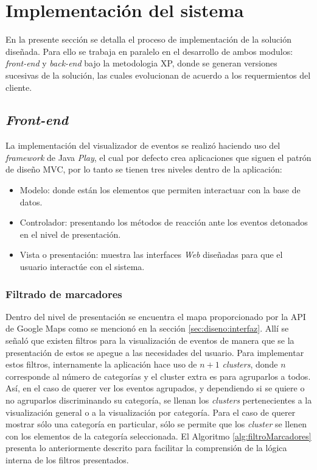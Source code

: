 \section{Implementación del sistema}
\label{sec:implementacion}

En la presente sección se detalla el proceso de implementación de la solución diseñada. Para ello se trabaja en paralelo en el desarrollo de ambos modulos: \textit{front-end} y \textit{back-end} bajo la metodologia XP, donde se generan versiones sucesivas de la solución, las cuales evolucionan de acuerdo a los requermientos del cliente.

\subsection{\textit{Front-end}}
\label{subsec:imp:visualizador}

La implementación del visualizador de eventos se realizó haciendo uso del \textit{framework} de Java \textit{Play}, el cual por defecto crea aplicaciones que siguen el patrón de diseño MVC, por lo tanto se tienen tres niveles dentro de la aplicación:

\begin{itemize}
\item Modelo: donde están los elementos que permiten interactuar con la base de datos. 
\item Controlador: presentando los métodos de reacción ante los eventos detonados en el nivel de presentación.
\item Vista o presentación: muestra las interfaces \textit{Web} diseñadas para que el usuario interactúe con el sistema.
\end{itemize}

\subsubsection*{Filtrado de marcadores}
\label{subsubsec:filtradoMarcadores}

Dentro del nivel de presentación se encuentra el mapa proporcionado por la API de Google Maps como se mencionó en la sección \ref{sec:diseno:interfaz}. Allí se señaló que existen filtros para la visualización de eventos de manera que se la presentación de estos se apegue a las necesidades del usuario. Para implementar estos filtros, internamente la aplicación hace uso de $n + 1$ \textit{clusters}, donde $n$ corresponde al número de categorías y el cluster extra es para agruparlos a todos. Así, en el caso de querer ver los eventos agrupados, y dependiendo si se quiere o no agruparlos discriminando su categoría, se llenan los \textit{clusters} pertenecientes a la visualización general o a la visualización por categoría. Para el caso de querer mostrar sólo una categoría en particular, sólo se permite que los \textit{cluster} se llenen con los elementos de la categoría seleccionada. El Algoritmo \ref{alg:filtroMarcadores} presenta lo anteriormente descrito para facilitar la comprensión de la lógica interna de los filtros presentados.\\

